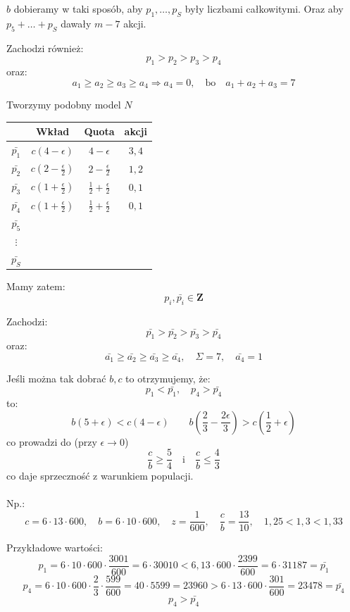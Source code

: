 \documentclass[12pt,a4paper]{article}
\theoremstyle{break}
\begin{document}
	$b$ dobieramy w taki sposób, aby $p_1,\dots,p_S$ były liczbami całkowitymi. Oraz aby $p_5+\dots+p_S$ dawały $m-7$ akcji.
	
	Zachodzi również:
	\[
	p_1 > p_2 > p_3 > p_4
	\]
	oraz:
	\[
	a_1 \geq a_2 \geq a_3 \geq a_4 \Rightarrow a_4 = 0, \quad \text{bo} \quad a_1 + a_2 + a_3 = 7
	\]
	
	Tworzymy podobny model $N$\\
	
	\begin{tabular}{c|c|c|c}
		& Wkład & Quota & akcji \\ \hline
		$\bar{p_1}$ & $c(4 - \epsilon)$ & $4 - \epsilon$ & $3, 4$ \\ \hline
		$\bar{p_2}$ & $c\left(2 - \frac{\epsilon}{2}\right)$ & $2 - \frac{\epsilon}{2}$ & $1, 2$ \\ \hline
		$\bar{p_3}$ & $c\left(1 + \frac{\epsilon}{2}\right)$ & $\frac{1}{2} + \frac{\epsilon}{2}$ & $0, 1$ \\ \hline
		$\bar{p_4}$ & $c\left(1 + \frac{\epsilon}{2}\right)$ & $\frac{1}{2} + \frac{\epsilon}{2}$ & $0, 1$ \\ \hline
		$\bar{p_5}$ & & & \\ \hline
		$\vdots$ & & & \\ \hline
		$\bar{p_S}$ & & & \\ \hline
	\end{tabular}
	
	Mamy zatem:
	\[
	p_i, \bar{p_i} \in \mathbf{Z}
	\]
	
	Zachodzi:
	\[
	\bar{p_1} > \bar{p_2} > \bar{p_3} > \bar{p_4}
	\]
	oraz:
	\[
	\bar{a_1} \geq \bar{a_2} \geq \bar{a_3} \geq \bar{a_4}, \quad \Sigma = 7, \quad \bar{a_4} = 1
	\]
	
	Jeśli można tak dobrać $b,c$ to otrzymujemy, że:
	\[
	p_1 < \bar{p_1}, \quad p_4 > \bar{p_4}
	\]
	to:
	\[
	b(5 + \epsilon) < c(4 - \epsilon) \qquad
	b\left(\frac{2}{3} - \frac{2\epsilon}{3}\right) > c\left(\frac{1}{2} + \epsilon\right)
	\]
	co prowadzi do (przy $\epsilon \rightarrow 0$)
	\[
	\frac{c}{b} \geq \frac{5}{4} \quad \text{i} \quad \frac{c}{b} \leq \frac{4}{3}
	\]
	co daje sprzeczność z warunkiem populacji.\\\\
	
	Np.:
	\[
	c = 6 \cdot 13 \cdot 600, \quad b = 6 \cdot 10 \cdot 600, \quad z = \frac{1}{600}, \quad \frac{c}{b} = \frac{13}{10}, \quad 1,25 < 1,3 < 1,33
	\]
	
	Przykładowe wartości:
	\[
	p_1 = 6 \cdot 10 \cdot 600 \cdot \frac{3001}{600} = 6 \cdot 30010 < 6,13 \cdot 600 \cdot \frac{2399}{600} = 6 \cdot 31187 = \bar{p_1}
	\]
	\[
	p_4 = 6 \cdot 10 \cdot 600 \cdot \frac{2}{3} \cdot \frac{599}{600} = 40 \cdot 5599 = 23960 > 6 \cdot 13 \cdot 600 \cdot \frac{301}{600} = 23478 = \bar{p_4}
	\]
	\[
	p_4 > \bar{p_4}
	\]
\end{document}

